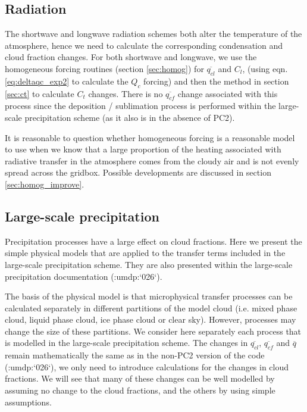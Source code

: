 \documentclass{UMDP_article}
\newcommand{\citeumdp}[1]{:umdp:`#1`}
\begin{document}
\subsection{Radiation}
\label{sec:rad}

The shortwave and longwave radiation schemes both alter the temperature
of the atmosphere, hence we need to calculate the corresponding condensation
and cloud fraction changes. For both shortwave and longwave, we use
the homogeneous forcing routines (section \ref{sec:homog})
for $\overline{q_{cl}}$ and $C_l$, (using eqn.
\ref{eq:deltaqc_exp2} to calculate the $Q_c$ forcing) and then the method in
section \ref{sec:ct} to calculate $C_t$ changes. There is no
$\overline{q_{cf}}$ change associated with this process since the
deposition / sublimation process is performed within the large-scale
precipitation scheme (as it also is in the absence of PC2).

It is reasonable to question whether homogeneous forcing is a reasonable
model to use when we know that a large proportion of the heating
associated with radiative transfer in the atmosphere comes from the
cloudy air and is not evenly spread across the gridbox. Possible developments
are discussed in section \ref{sec:homog_improve}.

\subsection{Large-scale precipitation}
\label{sec:precip}

Precipitation processes have a large effect on cloud fractions. Here we
present the simple physical models that are applied to the transfer
terms included in the large-scale precipitation scheme. They are also
presented within the large-scale precipitation documentation (\citeumdp{026}).

The basis of the physical model is that microphysical transfer processes can
be calculated separately in different partitions of the model cloud
(i.e. mixed phase cloud, liquid phase cloud, ice phase cloud or clear sky).
However, processes may change the size of these partitions. We consider
here separately each process that is modelled in the large-scale
precipitation scheme. The changes in $\overline{q_{cl}}$, $\overline{q_{cf}}$
and $\overline{q}$ remain mathematically the same as in the non-PC2 version
of the code (\citeumdp{026}), we only need
to introduce calculations for the changes in cloud fractions. We will see
that many of these
changes can be well modelled by assuming no change to the cloud fractions,
and the others by using simple assumptions.
\end{document}

